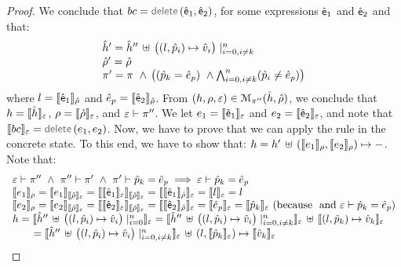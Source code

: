 \begin{proof}
\noindent{}
We conclude that $\bcmd = \jsildelete(\pvsexpr_1, \pvsexpr_2)$, for some expressions $\pvsexpr_1$ and $\pvsexpr_2$
and that: 
$$
\begin{array}{l}
\sheap' = \sheap'' \, \uplus \,  \big((\loc, \sexprp_i) \mapsto \sexprv_i\big)\mid_{i = 0, i \neq k}^n
\\ 
\sstore' = \sstore
\\ 
 \pc' = \pc \ \wedge \, \big( (\sexprp_k = \sexpr_p) \ \wedge \bigwedge_{i = 0, i \neq k}^n (\sexprp_i \neq \sexpr_p) \big)
\end{array}
$$
where $\loc = \symbeval{\pvsexpr_1}{\sstore}$ and $\sexpr_p = \symbeval{\pvsexpr_2}{\sstore}$.
From $(\heap, \store, \senv) \in \smodels{\sheap, \sstore}{\pc''}$, we conclude that $\heap = \semexpr{\sheap}{\senv}$, $\store = \semexpr{\sstore}{\senv}$, and 
$\senv \vdash \pc''$. We let $\jsilexpr_1 = \symbeval{\pvsexpr_1}{\senv}$ and 
$\jsilexpr_2 = \symbeval{\pvsexpr_2}{\senv}$, and note that $\symbeval{\bcmd}{\senv} = \jsildelete(\jsilexpr_1, \jsilexpr_2)$.
Now, we have to prove that we can apply the  rule in the concrete state.
To this end, we have to show that:
$\heap = \heap' \dunion \hcell{\symbeval{\jsilexpr_1}{\store}}{\symbeval{\jsilexpr_2}{\store}}{-}$. 
Note that: 
$$
\begin{array}{l}
%
\senv \vdash \pc'' \ \wedge \ \pc'' \vdash \pc' \ \wedge \ \pc' \vdash \sexprp_k = \sexpr_p \implies \senv \vdash \sexprp_k = \sexpr_p \\
%
 \symbeval{\jsilexpr_1}{\store} = \symbeval{\jsilexpr_1}{\symbeval{\sstore}{\senv}} = \symbeval{\symbeval{\pvsexpr_1}{\senv}}{\symbeval{\sstore}{\senv}} = \symbeval{\symbeval{\pvsexpr_1}{\sstore}}{\senv} 
    = \symbeval{\loc}{\senv} = \loc \\ 
  \symbeval{\jsilexpr_2}{\store}  = \symbeval{\jsilexpr_2}{\semexpr{\sstore}{\senv}} =  \symbeval{\symbeval{\pvsexpr_2}{\senv}}{\symbeval{\sstore}{\senv}} = \symbeval{\symbeval{\pvsexpr_2}{\sstore}}{\senv}
   =  \symbeval{\sexpr_p}{\senv} = \symbeval{\sexprp_k}{\senv}  \text{ (because $$ and $\senv \vdash \sexprp_k = \sexpr_p$)} \\
 \heap = \semexpr{\sheap'' \, \uplus \, \big((l, \sexprp_i) \mapsto \sexprv_i\big)\mid_{i = 0}^n}{\senv} 
       =  \semexpr{\sheap'' \, \uplus \, \big((l, \sexprp_i) \mapsto \sexprv_i\big)\mid_{i = 0, i \neq k}^n}{\senv} \dunion \semexpr{(l, \sexprp_k) \mapsto \sexprv_k}{\senv} \\
         \qquad = \semexpr{\sheap'' \, \uplus \, \big((l, \sexprp_i) \mapsto \sexprv_i\big)\mid_{i = 0, i \neq k}^n}{\senv} \dunion (l, \semexpr{\sexprp_k}{\senv}) \mapsto \semexpr{\sexprv_k}{\senv}  \\ 

\end{array}$$
\end{proof}
